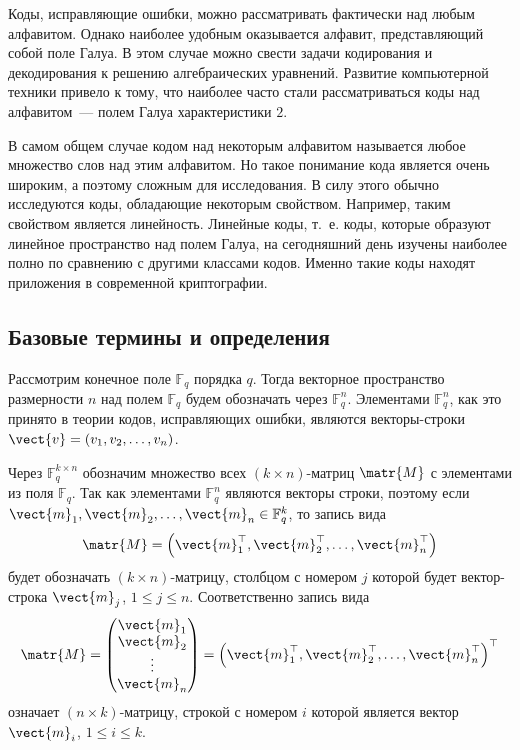 \documentclass[12pt]{extarticle}
\begin{document}
Коды, исправляющие ошибки, можно рассматривать фактически над любым алфавитом.
Однако наиболее удобным оказывается алфавит, представляющий собой поле Галуа.
В этом случае можно свести задачи кодирования и декодирования к решению алгебраических уравнений.
Развитие компьютерной техники привело к тому, что наиболее часто стали рассматриваться коды над алфавитом~--- полем Галуа характеристики \(2\).

В самом общем случае кодом над некоторым алфавитом называется любое множество слов над этим алфавитом.
Но такое понимание кода является очень широким, а поэтому сложным для исследования.
В силу этого обычно исследуются коды, обладающие некоторым свойством.
Например, таким свойством является линейность.
Линейные коды, т.~е. коды, которые образуют линейное пространство над полем Галуа, на сегодняшний день изучены наиболее полно по сравнению с другими классами кодов.
Именно такие коды находят приложения в современной криптографии.
\subsection{Базовые термины и определения}
\label{sec:org8f563f3}
Рассмотрим конечное поле \(\mathbb{F}_q\) порядка \(q\).
Тогда векторное пространство размерности \(n\) над полем \(\mathbb{F}_q\) будем обозначать через \(\mathbb{F}^n_q\).
Элементами \(\mathbb{F}^{n}_{q}\), как это принято в теории кодов, исправляющих ошибки, являются векторы-строки \(\vect{v} = \left(v_{1}, v_{2}, \dotsc, v_{n}\right)\).

Через \(\mathbb{F}^{k \times n}_{q}\) обозначим множество всех \((k \times n)\)-матриц \(\matr{M}\) с элементами из поля \(\mathbb{F}_{q}\).
Так как элементами \(\mathbb{F}^{n}_{q}\) являются векторы строки, поэтому если \(\vect{m}_1, \vect{m}_2, \dotsc ,\vect{m}_{n}\in \mathbb{F}^{k}_{q}\), то запись вида
\[ \matr{M}=\left(\vect{m}^{\top}_{1}, \vect{m}^{\top}_{2}, \dotsc, \vect{m}^{\top}_{n}\right) \]
будет обозначать \((k \times n)\)-матрицу, столбцом с номером \(j\) которой будет вектор-строка \(\vect{m}_j\), \(1\le j\le n\).
Соответственно запись вида
\[ \matr{M}= \begin{pmatrix}
             \vect{m}_{1}\\
             \vect{m}_{2}\\
             \vdots\\
             \vect{m}_{n}
             \end{pmatrix} = \left(\vect{m}^{\top}_{1}, \vect{m}^{\top}_{2}, \dotsc, \vect{m}^{\top}_{n}\right)^{\top} \]
означает \((n \times k)\)-матрицу, строкой с номером \(i\) которой является вектор \(\vect{m}_i\), \(1\le i\le k\).
\end{document}
